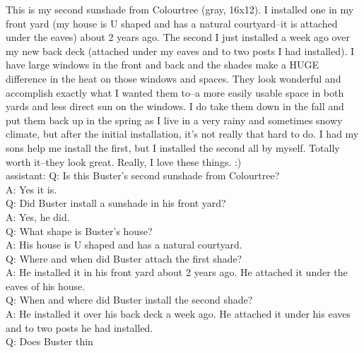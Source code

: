 \documentclass[10pt]{article}
\begin{document}
\begin{Form}
\begin{tcolorbox}[colback=convbg,colframe=itemframe,boxrule=0.8pt,arc=2pt,breakable,left=6pt,right=6pt,top=5pt,bottom=5pt]
{This is my second sunshade from Colourtree (gray, 16x12). I installed one in my front yard (my house is U shaped and has a natural courtyard--it is attached under the eaves) about 2 years ago. The second I just installed a week ago over my new back deck (attached under my eaves and to two posts I had installed). I have large windows in the front and back and the shades make a HUGE difference in the heat on those windows and spaces. They look wonderful and accomplish exactly what I wanted them to--a more easily usable space in both yards and less direct sun on the windows. I do take them down in the fall and put them back up in the spring as I live in a very rainy and sometimes snowy climate, but after the initial installation, it's not really that hard to do. I had my sons help me install the first, but I installed the second all by myself. Totally worth it--they look great. Really, I love these things. :) \\[2pt]
assistant: Q: Is this Buster's second sunshade from Colourtree? \\[2pt]
A: Yes it is. \\[2pt]
Q: Did Buster install a sunshade in his front yard? \\[2pt]
A: Yes, he did. \\[2pt]
Q: What shape is Buster's house? \\[2pt]
A: His house is U shaped and has a natural courtyard. \\[2pt]
Q: Where and when did Buster attach the first shade? \\[2pt]
A: He installed it in his front yard about 2 years ago. He attached it under the eaves of his house. \\[2pt]
Q: When and where did Buster install the second shade? \\[2pt]
A: He installed it over his back deck a week ago. He attached it under his eaves and to two posts he had installed. \\[2pt]
Q: Does Buster thin}
\end{tcolorbox}
\vspace{-1pt}
\CheckBox[name=q49c,width=1.6ex,height=1.6ex,bordercolor={0.45 0.45 0.45}]{~\textcolor{cbox}{COMPACT}}\quad
\CheckBox[name=q49d,width=1.6ex,height=1.6ex,bordercolor={0.45 0.45 0.45}]{~\textcolor{dbox}{DIFFUSE}}\quad
\CheckBox[name=q49n,width=1.6ex,height=1.6ex,bordercolor={0.45 0.45 0.45}]{~\textcolor{nbox}{NONE}}
\vspace{8pt}
\begin{tcolorbox}[colback=convbg,colframe=itemframe,boxrule=0.8pt,arc=2pt,breakable,left=6pt,right=6pt,top=5pt,bottom=5pt]

\end{tcolorbox}
\end{Form}
\end{document}

